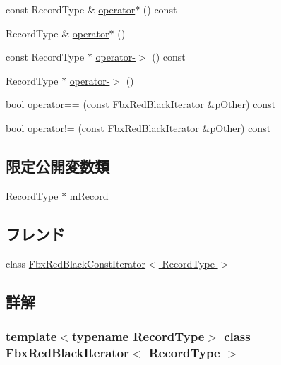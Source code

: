 \begin{DoxyCompactItemize}
\item 
const Record\+Type \& \hyperlink{class_fbx_red_black_iterator_ae8a4c3c275647234641fb62d71f00130}{operator$\ast$} () const
\item 
Record\+Type \& \hyperlink{class_fbx_red_black_iterator_a1f8632b341af30d1f92665e3a9206faf}{operator$\ast$} ()
\item 
const Record\+Type $\ast$ \hyperlink{class_fbx_red_black_iterator_a119327d8f6cad282780ad35bc45da243}{operator-\/$>$} () const
\item 
Record\+Type $\ast$ \hyperlink{class_fbx_red_black_iterator_a562051f415cb531defaedac5831720c5}{operator-\/$>$} ()
\item 
bool \hyperlink{class_fbx_red_black_iterator_a6535989054ef8b1f3c04d1993ee30c39}{operator==} (const \hyperlink{class_fbx_red_black_iterator}{Fbx\+Red\+Black\+Iterator} \&p\+Other) const
\item 
bool \hyperlink{class_fbx_red_black_iterator_aba270c5ac15573fed0c92a9dae6b94bc}{operator!=} (const \hyperlink{class_fbx_red_black_iterator}{Fbx\+Red\+Black\+Iterator} \&p\+Other) const
\end{DoxyCompactItemize}
\subsection*{限定公開変数類}
\begin{DoxyCompactItemize}
\item 
Record\+Type $\ast$ \hyperlink{class_fbx_red_black_iterator_a7512ddb246f903b32ed0249619761403}{m\+Record}
\end{DoxyCompactItemize}
\subsection*{フレンド}
\begin{DoxyCompactItemize}
\item 
class \hyperlink{class_fbx_red_black_iterator_a66eff8e39f55f28a1d234cca0e5496bf}{Fbx\+Red\+Black\+Const\+Iterator$<$ Record\+Type $>$}
\end{DoxyCompactItemize}


\subsection{詳解}
\subsubsection*{template$<$typename Record\+Type$>$\newline
class Fbx\+Red\+Black\+Iterator$<$ Record\+Type $>$}



